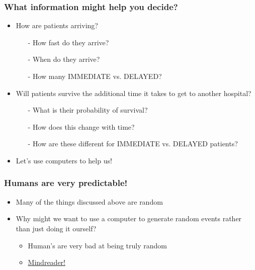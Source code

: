 \documentclass{beamer}
\begin{document}
\begin{frame}
  \frametitle{What information might help you decide?}
  \pause
  \begin{itemize}
    \item How are patients arriving?
    \begin{itemize}
      \item[-] How fast do they arrive?
      \item[-] When do they arrive?
      \item[-] How many IMMEDIATE vs. DELAYED?
    \end{itemize}
  \end{itemize}
  \pause
  \begin{itemize}
    \item Will patients survive the additional time it takes to get to another hospital?
    \begin{itemize}
      \item[-] What is their probability of survival?
      \item[-] How does this change with time?
      \item[-] How are these different for IMMEDIATE vs. DELAYED patients?
    \end{itemize}
    \pause
    \item Let's use computers to help us!
  \end{itemize}
\end{frame}

\begin{frame}
  \frametitle{Humans are very predictable!}
  \begin{itemize}
    \item Many of the things discussed above are random
    \item Why might we want to use a computer to generate random events rather than just doing it ourself? \pause
    \begin{itemize}
      \item Human's are very bad at being truly random
      \item \textcolor{blue}{\href{http://www.mindreaderpro.appspot.com/}{Mindreader!}}
    \end{itemize}
  \end{itemize}
\end{frame}

%
%
%
%
%
\end{document}
